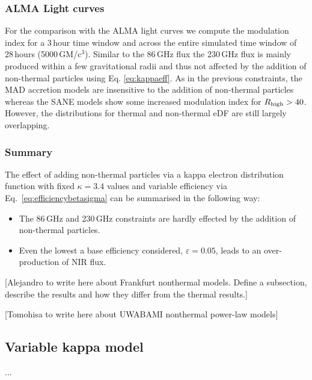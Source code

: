 \subsubsection{ALMA Light curves}
For the comparison with the ALMA light curves we compute the modulation index for a 3\,hour time window and across the entire simulated time window of 28\,hours (5000\,GM/c$^3$). Similar to the 86\,GHz flux the 230\,GHz flux is mainly produced within a few gravitational radii and thus not affected by the addition of non-thermal particles using Eq. \ref{eq:kappaeff}. As in the previous constraints, the MAD accretion models are insensitive to the addition of non-thermal particles whereas the SANE models show some increased modulation index for $R_{\rm high}>40$. However, the distributions for thermal and non-thermal eDF are still largely overlapping.


\subsubsection{Summary}
The effect of adding non-thermal particles via a kappa electron distribution function with fixed $\kappa=3.4$ values and variable efficiency via Eq.~\ref{eq:efficiencybetasigma} can be summarised in the following way:
\begin{itemize}
    \item The 86\,GHz and 230\,GHz constraints are hardly effected by the addition of non-thermal particles.
    \item Even the lowest a base efficiency considered, $\varepsilon=0.05$, leads to an over-production of NIR flux. 
\end{itemize}




[Alejandro to write here about Frankfurt nonthermal models.  Define a subsection, describe the results and how they differ from the thermal results.]

[Tomohisa to write here about UWABAMI nonthermal power-law models]



\subsection{Variable kappa model}
...


